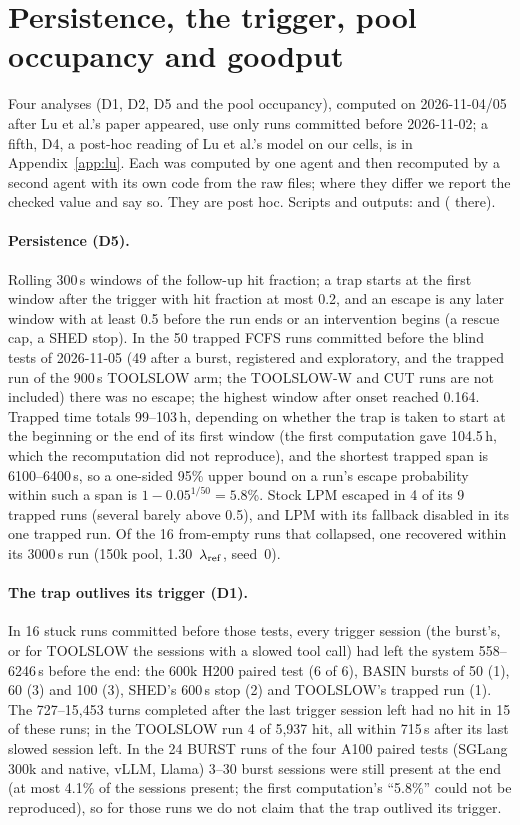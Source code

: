 \section{Persistence, the trigger, pool occupancy and goodput}\label{app:dataonly}

Four analyses (D1, D2, D5 and the pool occupancy), computed on 2026-11-04/05 after Lu et al.'s paper appeared, use only runs
committed before 2026-11-02; a fifth, D4, a post-hoc
reading of Lu et al.'s model on our cells, is in Appendix~\ref{app:lu}. Each was computed by one agent and then recomputed by a second agent
with its own code from the raw files; where they differ we report the checked value and say so. They are post hoc. Scripts and
outputs:  and  ( there).

\paragraph{Persistence (D5).} Rolling 300\,s windows of the follow-up hit fraction; a trap starts at the first window after the
trigger with hit fraction at most 0.2, and an escape is any later window with at least 0.5 before the run ends or an intervention
begins (a rescue cap, a SHED stop). In the 50 trapped FCFS runs committed before the blind tests of 2026-11-05 (49 after a burst, registered and exploratory,
and the trapped run of the 900\,s TOOLSLOW arm; the TOOLSLOW-W and CUT runs are not included) there was no escape; the highest window after onset reached 0.164. Trapped time totals 99--103\,h, depending on whether the
trap is taken to start at the beginning or the end of its first window (the first computation gave 104.5\,h, which the recomputation
did not reproduce), and the shortest trapped span is 6100--6400\,s, so a one-sided 95\% upper bound on a run's escape probability
within such a span is $1-0.05^{1/50}=5.8$\%. Stock LPM escaped in 4 of its 9 trapped runs (several barely above 0.5), and LPM with its
fallback disabled in its one trapped run. Of the 16 from-empty runs that collapsed, one recovered within its 3000\,s run (150k pool,
1.30~$\lambda_{\mathrm{ref}}$, seed~0).

\paragraph{The trap outlives its trigger (D1).} In 16 stuck runs committed before those tests, every trigger session (the burst's, or for TOOLSLOW the sessions
with a slowed tool call) had left the system 558--6246\,s before the end: the 600k H200 paired test (6 of 6), BASIN bursts of 50 (1),
60 (3) and 100 (3), SHED's 600\,s stop (2) and TOOLSLOW's trapped run (1). The 727--15{,}453 turns completed after the last trigger
session left had no hit in 15 of these runs; in the TOOLSLOW run 4 of 5{,}937 hit, all within 715\,s after its last slowed session left. In
the 24 BURST runs of the four A100 paired tests (SGLang 300k and native, vLLM, Llama) 3--30 burst sessions were still present at the
end (at most 4.1\% of the sessions present; the first computation's ``5.8\%'' could not be reproduced), so for those runs we do not
claim that the trap outlived its trigger.


